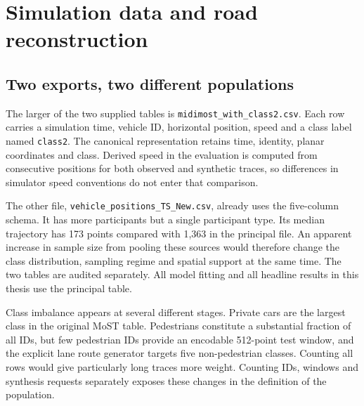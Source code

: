 \chapter{Simulation data and road reconstruction}
\label{ch:data}
\section{Two exports, two different populations}
The larger of the two supplied tables is \texttt{midimost\_with\_class2.csv}. Each row carries a simulation time, vehicle ID, horizontal position, speed and a class label named \texttt{class2}. The canonical representation retains time, identity, planar coordinates and class. Derived speed in the evaluation is computed from consecutive positions for both observed and synthetic traces, so differences in simulator speed conventions do not enter that comparison.

The other file, \texttt{vehicle\_positions\_TS\_New.csv}, already uses the five-column schema. It has more participants but a single participant type. Its median trajectory has 173 points compared with 1,363 in the principal file. An apparent increase in sample size from pooling these sources would therefore change the class distribution, sampling regime and spatial support at the same time. The two tables are audited separately. All model fitting and all headline results in this thesis use the principal table.


Class imbalance appears at several different stages. Private cars are the largest class in the original MoST table. Pedestrians constitute a substantial fraction of all IDs, but few pedestrian IDs provide an encodable 512-point test window, and the explicit lane route generator targets five non-pedestrian classes. Counting all rows would give particularly long traces more weight. Counting IDs, windows and synthesis requests separately exposes these changes in the definition of the population.

